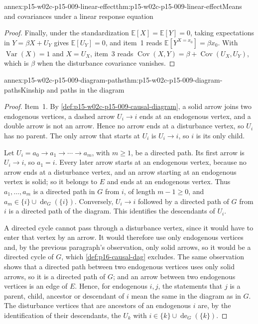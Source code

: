 \begin{annexitem}{annex:p15-w02c-p15-009-linear-effect}{thm:p15-w02c-p15-009-linear-effect}{Means and covariances under a linear response equation}
\begin{proof}
Finally, under the standardization \(\mathbb E[X]=\mathbb E[Y]=0\),
taking expectations in \(Y=\beta X+U_Y\) gives \(\mathbb E[U_Y]=0\), and
item~1 reads \(\mathbb E[Y^{X=x_0}]=\beta x_0\). With
\(\operatorname{Var}(X)=1\) and \(X=U_X\), item~3 reads
\(\operatorname{Cov}(X,Y)=\beta+\operatorname{Cov}(U_X,U_Y)\), which is
\(\beta\) when the disturbance covariance vanishes.
\end{proof}
\end{annexitem}

\begin{annexitem}{annex:p15-w02c-p15-009-diagram-paths}{thm:p15-w02c-p15-009-diagram-paths}{Kinship and paths in the diagram}
\begin{proof}
Item~1. By \cref{def:p15-w02c-p15-009-causal-diagram}, a solid arrow
joins two endogenous vertices, a dashed arrow \(U_i\to i\) ends at an
endogenous vertex, and a double arrow is not an arrow. Hence no arrow
ends at a disturbance vertex, so \(U_i\) has no parent. The only arrow
that starts at \(U_i\) is \(U_i\to i\), so \(i\) is its only child.

Let \(U_i=a_0\to a_1\to\cdots\to a_m\), with \(m\geq1\), be a directed
path. Its first arrow is \(U_i\to i\), so \(a_1=i\). Every later arrow
starts at an endogenous vertex, because no arrow ends at a disturbance
vertex, and an arrow starting at an endogenous vertex is solid; so it
belongs to \(E\) and ends at an endogenous vertex. Thus
\(a_1,\ldots,a_m\) is a directed path in \(G\) from \(i\), of length
\(m-1\geq0\), and \(a_m\in\{i\}\cup\operatorname{de}_G(\{i\})\).
Conversely, \(U_i\to i\) followed by a directed path of \(G\) from \(i\)
is a directed path of the diagram. This identifies the descendants of
\(U_i\).

A directed cycle cannot pass through a disturbance vertex, since it would
have to enter that vertex by an arrow. It would therefore use only
endogenous vertices and, by the previous paragraph's observation, only
solid arrows, so it would be a directed cycle of \(G\), which
\cref{def:p16-causal-dag} excludes. The same observation shows that a
directed path between two endogenous vertices uses only solid arrows, so
it is a directed path of \(G\); and an arrow between two endogenous
vertices is an edge of \(E\). Hence, for endogenous \(i,j\), the
statements that \(j\) is a parent, child, ancestor or descendant of \(i\)
mean the same in the diagram as in \(G\). The disturbance vertices that
are ancestors of an endogenous \(i\) are, by the identification of their
descendants, the \(U_k\) with \(i\in\{k\}\cup\operatorname{de}_G(\{k\})\).


\end{proof}
\end{annexitem}
